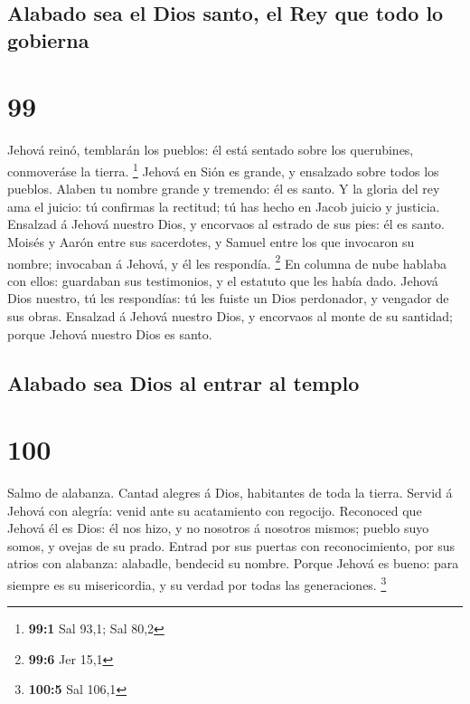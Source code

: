 \hypertarget{alabado-sea-el-dios-santo-el-rey-que-todo-lo-gobierna}{%
\subsection{Alabado sea el Dios santo, el Rey que todo lo
gobierna}\label{alabado-sea-el-dios-santo-el-rey-que-todo-lo-gobierna}}

\hypertarget{section-98}{%
\section{99}\label{section-98}}

 Jehová reinó, temblarán los pueblos: él está sentado sobre
los querubines, conmoveráse la tierra. \footnote{\textbf{99:1} Sal 93,1;
  Sal 80,2}  Jehová en Sión es grande, y ensalzado sobre
todos los pueblos.  Alaben tu nombre grande y tremendo: él
es santo.  Y la gloria del rey ama el juicio: tú confirmas
la rectitud; tú has hecho en Jacob juicio y justicia. 
Ensalzad á Jehová nuestro Dios, y encorvaos al estrado de sus pies: él
es santo.  Moisés y Aarón entre sus sacerdotes, y Samuel
entre los que invocaron su nombre; invocaban á Jehová, y él les
respondía. \footnote{\textbf{99:6} Jer 15,1}  En columna de
nube hablaba con ellos: guardaban sus testimonios, y el estatuto que les
había dado.  Jehová Dios nuestro, tú les respondías: tú les
fuiste un Dios perdonador, y vengador de sus obras. 
Ensalzad á Jehová nuestro Dios, y encorvaos al monte de su santidad;
porque Jehová nuestro Dios es santo.

\hypertarget{alabado-sea-dios-al-entrar-al-templo}{%
\subsection{Alabado sea Dios al entrar al
templo}\label{alabado-sea-dios-al-entrar-al-templo}}

\hypertarget{section-99}{%
\section{100}\label{section-99}}

 Salmo de alabanza. Cantad alegres á Dios, habitantes de
toda la tierra.  Servid á Jehová con alegría: venid ante su
acatamiento con regocijo.  Reconoced que Jehová él es Dios:
él nos hizo, y no nosotros á nosotros mismos; pueblo suyo somos, y
ovejas de su prado.  Entrad por sus puertas con
reconocimiento, por sus atrios con alabanza: alabadle, bendecid su
nombre.  Porque Jehová es bueno: para siempre es su
misericordia, y su verdad por todas las generaciones. \footnote{\textbf{100:5}
  Sal 106,1}

